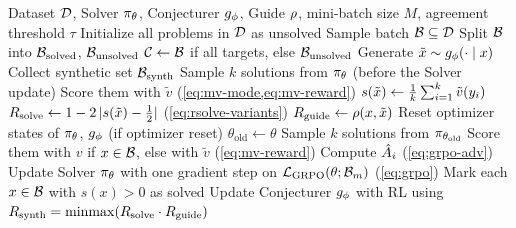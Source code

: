 \begin{algorithm}[tb]
  \caption{SGS-GRPO with majority-vote rewards and R-Zero $\Rsolve$ (on-policy Solver update)}
  \label{alg:sgs-grpo-mv-rzero}
  \begin{algorithmic}[1]
     Dataset $\mathcal{D}$, Solver $\pi_\theta$, Conjecturer $g_\phi$, Guide $\rho$, mini-batch size $M$, agreement threshold $\tau$
    \STATE Initialize all problems in $\mathcal{D}$ as unsolved
      \STATE Sample batch $\mathcal{B} \subseteq \mathcal{D}$
      \STATE Split $\mathcal{B}$ into $\mathcal{B}_{\mathrm{solved}}$, $\mathcal{B}_{\mathrm{unsolved}}$
      \STATE $\mathcal{C} \leftarrow \mathcal{B}$ if all targets, else $\mathcal{B}_{\mathrm{unsolved}}$
        \STATE Generate $\tilde{x} \sim g_\phi(\cdot \mid x)$
      \ENDFOR
      \STATE Collect synthetic set $\mathcal{B}_{\mathrm{synth}}$
        \STATE Sample $k$ solutions from $\pi_\theta$ (before the Solver update)
        \STATE Score them with $\tilde{v}$ (\cref{eq:mv-mode,eq:mv-reward})
        \STATE $s(\tilde{x}) \leftarrow \frac{1}{k}\sum_{i=1}^{k} \tilde{v}(y_i)$
        \STATE $R_{\text{solve}} \leftarrow 1 - 2\,|s(\tilde{x}) - \tfrac{1}{2}|$ (\cref{eq:rsolve-variants})
        \STATE $R_{\text{guide}} \leftarrow \rho(x, \tilde{x})$
      \ENDFOR
      \STATE Reset optimizer states of $\pi_\theta$, $g_\phi$ (if optimizer reset)
        \STATE $\theta_{\mathrm{old}} \leftarrow \theta$
          \STATE Sample $k$ solutions from $\pi_{\theta_{\mathrm{old}}}$
          \STATE Score them with $v$ if $x \in \mathcal{B}$, else with $\tilde{v}$ (\cref{eq:mv-reward})
          \STATE Compute $\hat{A}_i$ (\cref{eq:grpo-adv})
        \ENDFOR
        \STATE Update Solver $\pi_\theta$ with one gradient step on $\mathcal{L}_{\mathrm{GRPO}}(\theta; \mathcal{B}_m)$ (\cref{eq:grpo})
      \ENDFOR
      \STATE Mark each $x \in \mathcal{B}$ with $s(x) > 0$ as solved
      \STATE Update Conjecturer $g_\phi$ with RL using $R_{\text{synth}} = \operatorname{minmax}(R_{\text{solve}} \cdot R_{\text{guide}})$
    \ENDFOR
  \end{algorithmic}
\end{algorithm}
